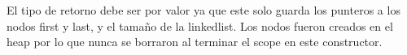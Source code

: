 \documentclass[]{article}
\begin{document}
    \begin{section}{}
        \begin{subsection}{}
            
        \end{subsection}
        \begin{subsection}{}
            
        \end{subsection}
        \begin{subsection}{}
            
        \end{subsection}
        \begin{subsection}{}
            El tipo de retorno debe ser por valor ya que este solo guarda los punteros a los nodos first y last, y el tamaño de la linkedlist. Los nodos fueron creados en el heap por lo que nunca se borraron al terminar el scope en este constructor.
        \end{subsection}
    \end{section}
    \begin{section}{}
        \begin{subsection}{}
            
        \end{subsection}
    \end{section}
    \begin{section}{}
        \begin{subsection}{}
            
        \end{subsection}
    \end{section}
\end{document}
